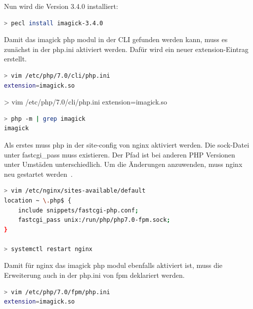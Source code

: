 Nun wird die Version 3.4.0 installiert:
\begin{lstlisting}[language=Bash, caption=PECL Install Imagick Modul,label={lst:peclinstallimagick}]
> pecl install imagick-3.4.0
\end{lstlisting}
\vspace{5mm}

Damit das imagick php modul in der CLI gefunden werden kann, muss es zunächst in der php.ini aktiviert werden.
Dafür wird ein neuer extension-Eintrag erstellt.

\begin{lstlisting}[language=Bash, caption=PHP Imagick aktivieren,label={lst:phpactivateimagick}]
> vim /etc/php/7.0/cli/php.ini
extension=imagick.so
\end{lstlisting}
\vspace{5mm}

> vim /etc/php/7.0/cli/php.ini
extension=imagick.so

\begin{lstlisting}[language=Bash, caption=PHP Überprüfe Imagick Modul,label={lst:phpcheckimagicksuccess}]
> php -m | grep imagick
imagick
\end{lstlisting}
\vspace{5mm}


Als erstes muss php in der site-config von nginx aktiviert werden. 
Die sock-Datei unter fastcgi\_pass muss existieren. 
Der Pfad ist bei anderen PHP Versionen unter Umstäden unterschiedlich. 
Um die Änderungen anzuwenden, muss nginx neu gestartet werden~\cite{InstallNginxPHP}.

\begin{lstlisting}[language=Bash, caption=NGINX Default-Config,label={lst:nginxdefaultconf}]
> vim /etc/nginx/sites-available/default
location ~ \.php$ {
    include snippets/fastcgi-php.conf;
    fastcgi_pass unix:/run/php/php7.0-fpm.sock;
}

> systemctl restart nginx
\end{lstlisting}
\vspace{5mm}


Damit für nginx das imagick php modul ebenfalls aktiviert ist, muss die Erweiterung auch in der php.ini von fpm deklariert werden.

\begin{lstlisting}[language=Bash, caption=PHP-FPM Imagick Modul aktivieren,label={lst:phpfpmaddimagick}]
> vim /etc/php/7.0/fpm/php.ini
extension=imagick.so
\end{lstlisting}
\vspace{5mm}

